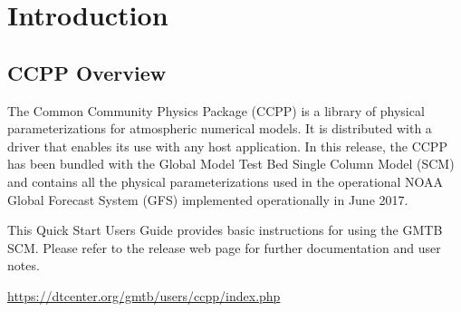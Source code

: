 \chapter{Introduction}
\setlength{\parskip}{12pt}
\section{CCPP Overview}

The Common Community Physics Package (CCPP) is a library of physical parameterizations for atmospheric numerical models. It is distributed with a driver that enables its use with any host application. In this release, the CCPP has been bundled with the Global Model Test Bed Single Column Model (SCM) and contains all the physical parameterizations used in the operational NOAA Global Forecast System (GFS) implemented operationally in June 2017.

This Quick Start Users Guide provides basic instructions for using the GMTB SCM.  Please refer to the release web page for further documentation and user notes.

\url{https://dtcenter.org/gmtb/users/ccpp/index.php}
